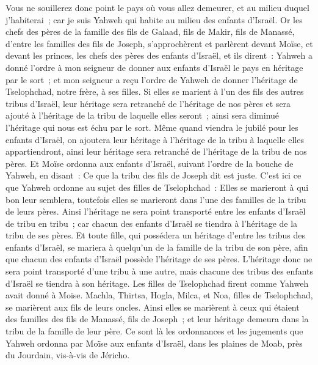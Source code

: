 \begin{multicols}{2}
Vous ne souillerez donc point le pays où vous allez demeurer, et au milieu duquel j'habiterai~; car je suis Yahweh qui habite au milieu des enfants d'Israël.
\VerseOne{}Or les chefs des pères de la famille des fils de Galaad, fils de Makir, fils de Manassé, d'entre les familles des fils de Joseph, s'approchèrent et parlèrent devant Moïse, et devant les princes, les chefs des pères des enfants d'Israël,
et ils dirent~: Yahweh a donné l'ordre à mon seigneur de donner aux enfants d'Israël le pays en héritage par le sort~; et mon seigneur a reçu l'ordre de Yahweh de donner l'héritage de Tselophchad, notre frère, à ses filles.
Si elles se marient à l'un des fils des autres tribus d'Israël, leur héritage sera retranché de l'héritage de nos pères et sera ajouté à l'héritage de la tribu de laquelle elles seront~; ainsi sera diminué l'héritage qui nous est échu par le sort.
Même quand viendra le jubilé pour les enfants d'Israël, on ajoutera leur héritage à l'héritage de la tribu à laquelle elles appartiendront, ainsi leur héritage sera retranché de l'héritage de la tribu de nos pères.
Et Moïse ordonna aux enfants d'Israël, suivant l'ordre de la bouche de Yahweh, en disant~: Ce que la tribu des fils de Joseph dit est juste.
C'est ici ce que Yahweh ordonne au sujet des filles de Tselophchad~: Elles se marieront à qui bon leur semblera, toutefois elles se marieront dans l'une des familles de la tribu de leurs pères.
Ainsi l'héritage ne sera point transporté entre les enfants d'Israël de tribu en tribu~; car chacun des enfants d'Israël se tiendra à l'héritage de la tribu de ses pères.
Et toute fille, qui possédera un héritage d'entre les tribus des enfants d'Israël, se mariera à quelqu'un de la famille de la tribu de son père, afin que chacun des enfants d'Israël possède l'héritage de ses pères.
L'héritage donc ne sera point transporté d'une tribu à une autre, mais chacune des tribus des enfants d'Israël se tiendra à son héritage.
Les filles de Tselophchad firent comme Yahweh avait donné à Moïse.
Machla, Thirtsa, Hogla, Milca, et Noa, filles de Tselophchad, se marièrent aux fils de leurs oncles.
Ainsi elles se marièrent à ceux qui étaient des familles des fils de Manassé, fils de Joseph~; et leur héritage demeura dans la tribu de la famille de leur père.
Ce sont là les ordonnances et les jugements que Yahweh ordonna par Moïse aux enfants d'Israël, dans les plaines de Moab, près du Jourdain, vis-à-vis de Jéricho.
\PPE{}
\end{multicols}
